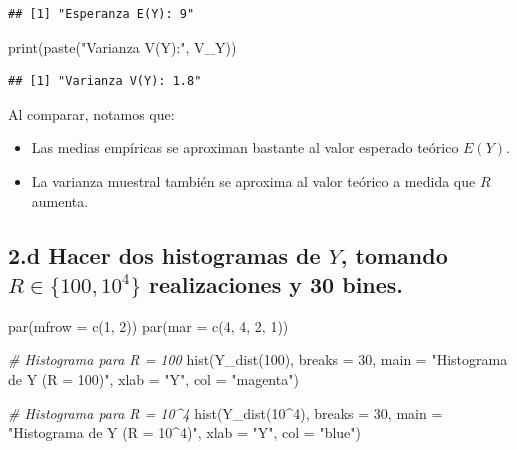 \documentclass[
]{article}
\newenvironment{Shaded}{}{}
\newcommand{\AttributeTok}[1]{\textcolor[rgb]{0.49,0.56,0.16}{#1}}
\newcommand{\CommentTok}[1]{\textcolor[rgb]{0.38,0.63,0.69}{\textit{#1}}}
\newcommand{\DecValTok}[1]{\textcolor[rgb]{0.25,0.63,0.44}{#1}}
\newcommand{\FunctionTok}[1]{\textcolor[rgb]{0.02,0.16,0.49}{#1}}
\newcommand{\NormalTok}[1]{#1}
\newcommand{\SpecialCharTok}[1]{\textcolor[rgb]{0.25,0.44,0.63}{#1}}
\newcommand{\StringTok}[1]{\textcolor[rgb]{0.25,0.44,0.63}{#1}}
\providecommand{\tightlist}{%
  \setlength{\itemsep}{0pt}\setlength{\parskip}{0pt}}
\begin{document}
\begin{verbatim}
## [1] "Esperanza E(Y): 9"
\end{verbatim}

\begin{Shaded}
\begin{Highlighting}[]
\FunctionTok{print}\NormalTok{(}\FunctionTok{paste}\NormalTok{(}\StringTok{"Varianza V(Y):"}\NormalTok{, V\_Y))}
\end{Highlighting}
\end{Shaded}

\begin{verbatim}
## [1] "Varianza V(Y): 1.8"
\end{verbatim}

Al comparar, notamos que:

\begin{itemize}
\tightlist
\item
  Las medias empíricas se aproximan bastante al valor esperado teórico
  \(E(Y)\).
\item
  La varianza muestral también se aproxima al valor teórico a medida que
  \(R\) aumenta.
\end{itemize}

\subsection{\texorpdfstring{2.d Hacer dos histogramas de \(Y\), tomando
\(R \in \{100, 10^4\}\) realizaciones y 30
bines.}{2.d Hacer dos histogramas de Y, tomando R \textbackslash in \textbackslash\{100, 10\^{}4\textbackslash\} realizaciones y 30 bines.}}\label{d-hacer-dos-histogramas-de-y-tomando-r-in-100-104-realizaciones-y-30-bines.}

\begin{Shaded}
\begin{Highlighting}[]
\FunctionTok{par}\NormalTok{(}\AttributeTok{mfrow =} \FunctionTok{c}\NormalTok{(}\DecValTok{1}\NormalTok{, }\DecValTok{2}\NormalTok{))  }
\FunctionTok{par}\NormalTok{(}\AttributeTok{mar =} \FunctionTok{c}\NormalTok{(}\DecValTok{4}\NormalTok{, }\DecValTok{4}\NormalTok{, }\DecValTok{2}\NormalTok{, }\DecValTok{1}\NormalTok{)) }

\CommentTok{\# Histograma para R = 100}
\FunctionTok{hist}\NormalTok{(}\FunctionTok{Y\_dist}\NormalTok{(}\DecValTok{100}\NormalTok{), }\AttributeTok{breaks =} \DecValTok{30}\NormalTok{, }\AttributeTok{main =} \StringTok{"Histograma de Y (R = 100)"}\NormalTok{, }\AttributeTok{xlab =} \StringTok{"Y"}\NormalTok{, }\AttributeTok{col =} \StringTok{"magenta"}\NormalTok{)}

\CommentTok{\# Histograma para R = 10\^{}4}
\FunctionTok{hist}\NormalTok{(}\FunctionTok{Y\_dist}\NormalTok{(}\DecValTok{10}\SpecialCharTok{\^{}}\DecValTok{4}\NormalTok{), }\AttributeTok{breaks =} \DecValTok{30}\NormalTok{, }\AttributeTok{main =} \StringTok{"Histograma de Y (R = 10\^{}4)"}\NormalTok{, }\AttributeTok{xlab =} \StringTok{"Y"}\NormalTok{, }\AttributeTok{col =} \StringTok{"blue"}\NormalTok{)}
\end{Highlighting}
\end{Shaded}
\end{document}
